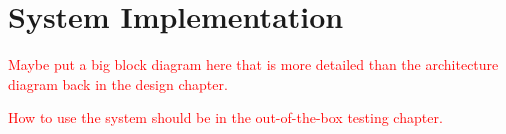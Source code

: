 \chapter{System Implementation}

\textcolor{red}{Maybe put a big block diagram here that is more detailed than the architecture diagram back in the design chapter.}

\textcolor{red}{How to use the system should be in the out-of-the-box testing chapter.}